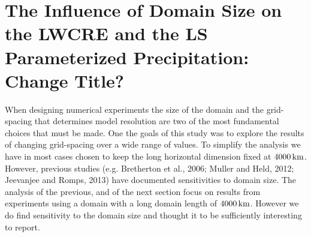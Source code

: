 \documentclass[11pt]{article}   	%
\begin{document}
%

\section{The Influence of Domain Size on the LWCRE and the LS Parameterized Precipitation: Change Title?}


%

When designing numerical experiments the size of the domain and the grid-spacing that determines model resolution are two of the most 
fundamental choices that must be made.   One the goals of this study was to explore the results of changing grid-spacing over a wide 
range of values.  To simplify the analysis we have in most cases chosen to keep the 
long horizontal dimension fixed at $4000\, \rm{km}$.  However, previous studies (e.g. Bretherton et al., 2006; Muller and Held, 2012; Jeevanjee and Romps, 2013) have 
documented sensitivities to domain size.   The analysis of the previous, and of the next section focus on results from experiments using
a domain with a long domain length of $4000 \, \rm{km}$.  However we do find sensitivity to the domain size and thought it to be
sufficiently interesting to report.  
\end{document}
